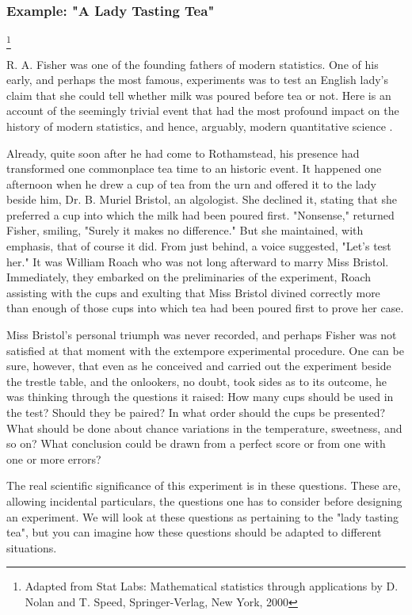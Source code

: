 \subsubsection{Example: "A Lady Tasting Tea"}\footnote{Adapted from Stat Labs: Mathematical statistics through applications by D. Nolan and T. Speed, Springer-Verlag, New York, 2000}

R. A. Fisher was one of the founding fathers of modern statistics. One of his early, and perhaps the most famous, experiments was to test an English lady's claim that she could tell whether milk was poured before tea or not. Here is an account of the seemingly trivial event that had the most profound impact on the history of modern statistics, and hence, arguably, modern quantitative science \cite{Box1978}.

\begin{adjustwidth}{2.5em}{2.5em}
    Already, quite soon after he had come to Rothamstead, his presence had transformed one commonplace tea time to an historic event. It happened one afternoon when he drew a cup of tea from the urn and offered it to the lady beside him, Dr. B. Muriel Bristol, an algologist. She declined it, stating that she preferred a cup into which the milk had been poured first. "Nonsense," returned Fisher, smiling, "Surely it makes no difference." But she maintained, with emphasis, that of course it did. From just behind, a voice suggested, "Let's test her." It was William Roach who was not long afterward to marry Miss Bristol. Immediately, they embarked on the preliminaries of the experiment, Roach assisting with the cups and exulting that Miss Bristol divined correctly more than enough of those cups into which tea had been poured first to prove her case.

    Miss Bristol's personal triumph was never recorded, and perhaps Fisher was not satisfied at that moment with the extempore experimental procedure. One can be sure, however, that even as he conceived and carried out the experiment beside the trestle table, and the onlookers, no doubt, took sides as to its outcome, he was thinking through the questions it raised: How many cups should be used in the test? Should they be paired? In what order should the cups be presented? What should be done about chance variations in the temperature, sweetness, and so on? What conclusion could be drawn from a perfect score or from one with one or more errors?
\end{adjustwidth}

The real scientific significance of this experiment is in these questions. These are, allowing incidental particulars, the questions one has to consider before designing an experiment. We will look at these questions as pertaining to the "lady tasting tea", but you can imagine how these questions should be adapted to different situations.

